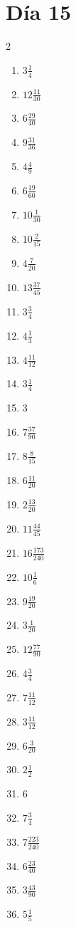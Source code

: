 \documentclass[12pt]{article}
\begin{document}
\section*{Día 15}
\begin{multicols}{2}\begin{enumerate}
\item $ 3 \frac{1}{4} $
\item $ 12 \frac{11}{30} $
\item $ 6 \frac{29}{40} $
\item $ 9 \frac{31}{36} $
\item $ 4 \frac{4}{9} $
\item $ 6 \frac{19}{60} $
\item $ 10 \frac{1}{30} $
\item $ 10 \frac{2}{15} $
\item $ 4 \frac{7}{20} $
\item $ 13 \frac{37}{45} $
\item $ 3 \frac{3}{4} $
\item $ 4 \frac{1}{3} $
\item $ 4 \frac{11}{12} $
\item $ 3 \frac{1}{4} $
\item $ 3 $
\item $ 7 \frac{37}{90} $
\item $ 8 \frac{8}{15} $
\item $ 6 \frac{11}{20} $
\item $ 2 \frac{13}{20} $
\item $ 11 \frac{44}{45} $
\item $ 16 \frac{173}{240} $
\item $ 10 \frac{1}{6} $
\item $ 9 \frac{19}{20} $
\item $ 3 \frac{1}{20} $
\item $ 12 \frac{77}{90} $
\item $ 4 \frac{3}{4} $
\item $ 7 \frac{11}{12} $
\item $ 3 \frac{11}{12} $
\item $ 6 \frac{3}{20} $
\item $ 2 \frac{1}{2} $
\item $ 6 $
\item $ 7 \frac{3}{4} $
\item $ 7 \frac{223}{240} $
\item $ 6 \frac{23}{40} $
\item $ 3 \frac{43}{90} $
\item $ 5 \frac{1}{5} $

\end{enumerate}
\end{multicols}
\end{document}
